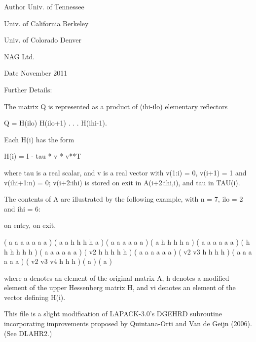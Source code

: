 \begin{DoxyAuthor}{Author}
Univ. of Tennessee 

Univ. of California Berkeley 

Univ. of Colorado Denver 

N\+A\+G Ltd. 
\end{DoxyAuthor}
\begin{DoxyDate}{Date}
November 2011 
\end{DoxyDate}
\begin{DoxyParagraph}{Further Details\+: }
\begin{DoxyVerb}  The matrix Q is represented as a product of (ihi-ilo) elementary
  reflectors

     Q = H(ilo) H(ilo+1) . . . H(ihi-1).

  Each H(i) has the form

     H(i) = I - tau * v * v**T

  where tau is a real scalar, and v is a real vector with
  v(1:i) = 0, v(i+1) = 1 and v(ihi+1:n) = 0; v(i+2:ihi) is stored on
  exit in A(i+2:ihi,i), and tau in TAU(i).

  The contents of A are illustrated by the following example, with
  n = 7, ilo = 2 and ihi = 6:

  on entry,                        on exit,

  ( a   a   a   a   a   a   a )    (  a   a   h   h   h   h   a )
  (     a   a   a   a   a   a )    (      a   h   h   h   h   a )
  (     a   a   a   a   a   a )    (      h   h   h   h   h   h )
  (     a   a   a   a   a   a )    (      v2  h   h   h   h   h )
  (     a   a   a   a   a   a )    (      v2  v3  h   h   h   h )
  (     a   a   a   a   a   a )    (      v2  v3  v4  h   h   h )
  (                         a )    (                          a )

  where a denotes an element of the original matrix A, h denotes a
  modified element of the upper Hessenberg matrix H, and vi denotes an
  element of the vector defining H(i).

  This file is a slight modification of LAPACK-3.0's DGEHRD
  subroutine incorporating improvements proposed by Quintana-Orti and
  Van de Geijn (2006). (See DLAHR2.)\end{DoxyVerb}
 
\end{DoxyParagraph}
\hypertarget{group__realGEcomputational_ga1e2c1e289965eabae7fb4a1bd78aed2c}{}

